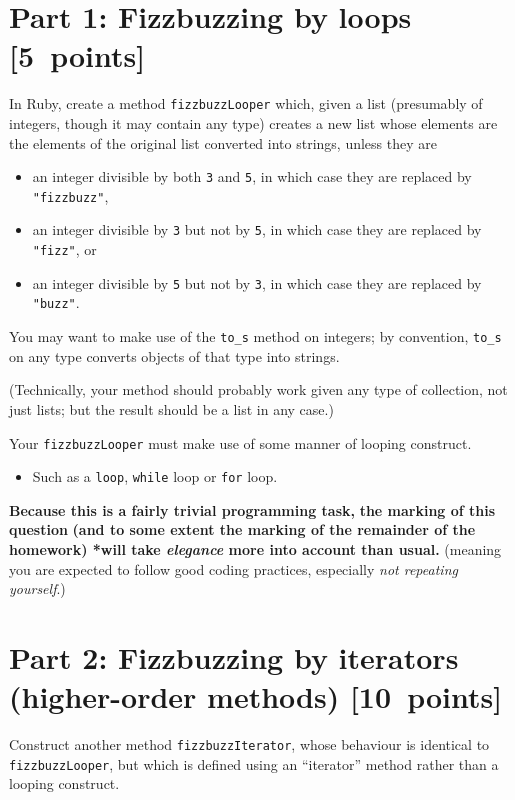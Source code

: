 \documentclass[11pt]{article}
\begin{document}
\section*{Part 1: Fizzbuzzing by loops                            [5 points]}
\label{sec:orgfec8f85}
In Ruby, create a method \texttt{fizzbuzzLooper} which, given a list
(presumably of integers, though it may contain any type)
creates a new list whose elements
are the elements of the original list
converted into strings, unless they are
\begin{itemize}
\item an integer divisible by both \texttt{3} and \texttt{5}, in which case
they are replaced by \texttt{"fizzbuzz"},
\item an integer divisible by \texttt{3} but not by \texttt{5}, in which case
they are replaced by \texttt{"fizz"}, or
\item an integer divisible by \texttt{5} but not by \texttt{3}, in which case
they are replaced by \texttt{"buzz"}.
\end{itemize}

You may want to make use of the \texttt{to\_s} method on integers;
by convention, \texttt{to\_s} on any type converts
objects of that type into strings.

(Technically, your method should probably work
given any type of collection, not just lists;
but the result should be a list in any case.)

Your \texttt{fizzbuzzLooper} must make use of some manner of
looping construct.
\begin{itemize}
\item Such as a \texttt{loop}, \texttt{while} loop or \texttt{for} loop.
\end{itemize}

\begin{center}
\textbf{Because this is a fairly trivial programming task,}
\textbf{the marking of this question}
\textbf{(and to some extent the marking of the remainder of the homework)
*will take \emph{elegance} more into account than usual.}
(meaning you are expected to follow good coding practices,
especially \emph{not repeating yourself}.)
\end{center}

\section*{Part 2: Fizzbuzzing by iterators (higher-order methods) [10 points]}
\label{sec:orgffb0cf1}
Construct another method \texttt{fizzbuzzIterator},
whose behaviour is identical to \texttt{fizzbuzzLooper},
but which is defined using an “iterator” method
rather than a looping construct.
\end{document}
